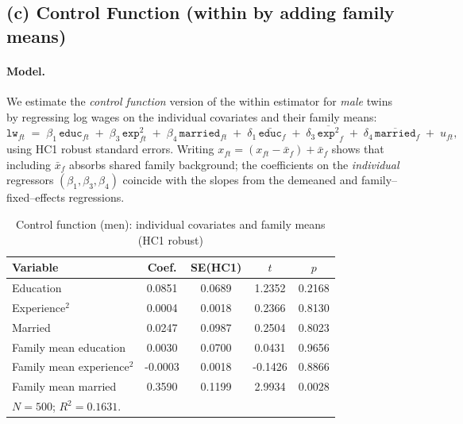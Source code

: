 \documentclass[12pt]{article}
\begin{document}
\subsection*{(c) Control Function (within by adding family means)}

\paragraph{Model.}
We estimate the \emph{control function} version of the within estimator for \textit{male} twins by regressing log wages on the individual covariates and their family means:
\[
  \texttt{lw}_{ft}
  \;=\; \beta_1\,\texttt{educ}_{ft}
  \;+\; \beta_3\,\texttt{exp}^2_{ft}
  \;+\; \beta_4\,\texttt{married}_{ft}
  \;+\; \delta_1\,\bar{\texttt{educ}}_{f}
  \;+\; \delta_3\,\overline{\texttt{exp}^2}_{f}
  \;+\; \delta_4\,\overline{\texttt{married}}_{f}
  \;+\; u_{ft},
\]
using HC1 robust standard errors. Writing \(x_{ft}=(x_{ft}-\bar x_f)+\bar x_f\) shows that including \(\bar x_f\) absorbs shared family background; the coefficients on the \emph{individual} regressors
\((\beta_1,\beta_3,\beta_4)\) coincide with the slopes from the demeaned and family–fixed–effects regressions.

\begin{table}[htbp]
  \centering
  \caption{Control function (men): individual covariates and family means (HC1 robust)}
  \label{tab:q4c_ctrl_men}
  \small
  \begin{tabular}{l
                  S[table-format=1.4]
                  S[table-format=1.4]
                  S[table-format=2.4]
                  S[table-format=1.4]}
    \toprule
    Variable & {Coef.} & {SE(HC1)} & {$t$} & {$p$} \\
    \midrule
    Education                     & 0.0851 & 0.0689 & 1.2352 & 0.2168 \\
    Experience$^{2}$              & 0.0004 & 0.0018 & 0.2366 & 0.8130 \\
    Married                       & 0.0247 & 0.0987 & 0.2504 & 0.8023 \\
    Family mean education         & 0.0030 & 0.0700 & 0.0431 & 0.9656 \\
    Family mean experience$^{2}$  & -0.0003& 0.0018 & -0.1426& 0.8866 \\
    Family mean married           & 0.3590 & 0.1199 & 2.9934 & 0.0028 \\
    \midrule
     \\
    \bottomrule
  \end{tabular}
\end{table}
\end{document}
